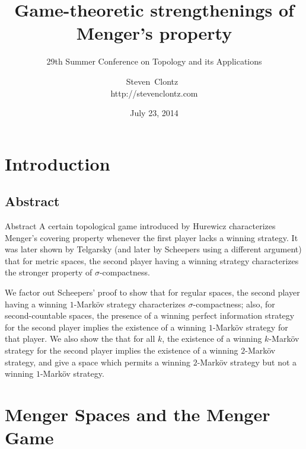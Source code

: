 \documentclass{beamer}
\title
{Game-theoretic strengthenings of Menger's property}
\subtitle
{29th Summer Conference on Topology and its Applications} %
\author%
{Steven~Clontz~\\http://stevenclontz.com}%
\institute[Auburn University] %
{
  Department of Mathematics and Statistics\\
  Auburn University}
\date[14-07-23] %
{July 23, 2014}
\theoremstyle{definition}
\newcommand{\<}{\langle}
\renewcommand{\>}{\rangle}
\begin{document}
\renewcommand{\pause}{}
\newcommand{\vpause}{\pause\vspace{1em}}

\begin{frame}
  \titlepage
\end{frame}



\section{Introduction}

\subsection{Abstract}

\begin{frame}{Abstract}%
    \small
    A certain topological game introduced by Hurewicz characterizes Menger's
    covering property whenever the first player lacks a winning strategy. It
    was later shown by Telgarsky (and later by Scheepers using a different
    argument) that for metric spaces, the second player having a winning
    strategy characterizes the stronger property of $\sigma$-compactness.

    \vspace{1em}

    We factor out Scheepers' proof to show
    that for regular spaces, the second player having a winning $1$-Mark\"ov
    strategy characterizes $\sigma$-compactness; also, for second-countable
    spaces, the presence of a winning perfect information strategy for the
    second player implies the existence of a winning $1$-Mark\"ov strategy for
    that player. We also show the that for all $k$, the existence of a
    winning $k$-Mark\"ov strategy for the second player implies the existence
    of a winning $2$-Mark\"ov strategy, and give a space which permits
    a winning $2$-Mark\"ov strategy but not a winning $1$-Mark\"ov strategy.
\end{frame}

\section{Menger Spaces and the Menger Game}
\end{document}
